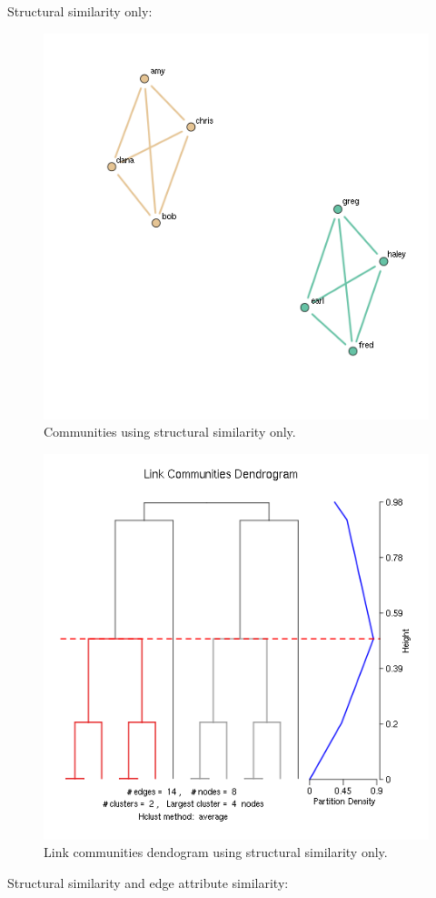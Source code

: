 \documentclass{report}
\begin{document}
Structural similarity only:

\begin{figure}[htp!]
  \centering
  \includegraphics[width=0.65\linewidth]{toy2/no_ea/edge_comm.png}
  \caption{Communities using structural similarity only.}
\end{figure}

\begin{figure}[htp!]
  \centering
  \includegraphics[width=0.65\linewidth]{toy2/no_ea/lc.png}
  \caption{Link communities dendogram using structural similarity only.}
\end{figure}

Structural similarity and edge attribute similarity:
\end{document}
